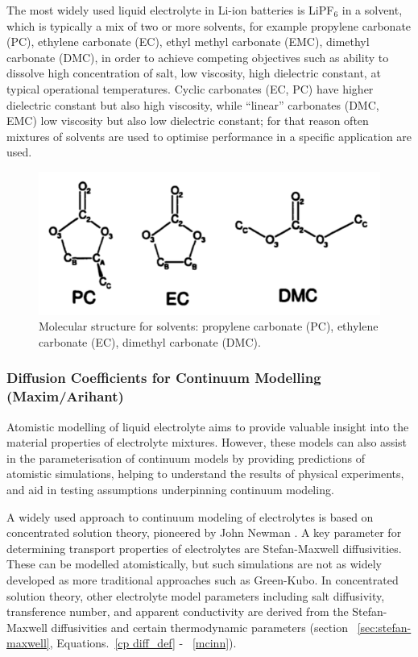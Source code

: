 \documentclass[../main.tex]{subfiles}
\begin{document}
The most widely used liquid electrolyte in Li-ion batteries is LiPF$_6$ in a solvent, which is typically a mix of two or more solvents, for example propylene carbonate (PC), ethylene carbonate (EC), ethyl methyl carbonate (EMC), dimethyl carbonate (DMC), in order to achieve competing objectives such as ability to dissolve high concentration of salt, low viscosity, high dielectric constant, at typical operational temperatures. Cyclic carbonates (EC, PC) have higher dielectric constant but also high viscosity, while ``linear'' carbonates (DMC, EMC) low viscosity but also low dielectric constant; for that reason often mixtures of solvents are used to optimise performance in a specific application are used.

\begin{figure}
    \centering
    \includegraphics[scale=0.3]{figures/LE1.PNG}
    \caption{Molecular structure for solvents: propylene carbonate (PC), ethylene carbonate (EC), dimethyl carbonate (DMC).}
    \label{fig:LE1}
\end{figure}

\subsubsection{Diffusion Coefficients for Continuum Modelling (Maxim/Arihant)}
Atomistic modelling of liquid electrolyte aims to provide valuable insight into the material properties of electrolyte mixtures. However, these models can also assist in the parameterisation of continuum models by providing predictions of atomistic simulations, helping to understand the results of physical experiments, and aid in testing assumptions underpinning continuum modeling.


A widely used approach to continuum modeling of electrolytes is based on concentrated solution theory, pioneered by John Newman . A key parameter for determining transport properties of electrolytes are Stefan-Maxwell diffusivities. These can be modelled atomistically, but such simulations are not as widely developed as more traditional approaches such as Green-Kubo. In concentrated solution theory, other electrolyte model parameters including salt diffusivity, transference number,  and apparent conductivity are derived from the Stefan-Maxwell diffusivities and certain thermodynamic parameters (section ~\ref{sec:stefan-maxwell}, Equations.~\ref{cp diff_def} -  ~\ref{mcinn}).
\end{document}
